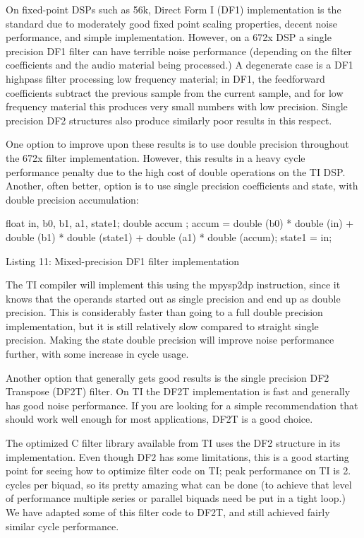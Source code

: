 On fixed-\/point D\+S\+Ps such as 56k, Direct Form I (D\+F1) implementation is the standard due to moderately good fixed point scaling properties, decent noise performance, and simple implementation. However, on a 672x D\+S\+P a single precision D\+F1 filter can have terrible noise performance (depending on the filter coefficients and the audio material being processed.) A degenerate case is a D\+F1 highpass filter processing low frequency material; in D\+F1, the feedforward coefficients subtract the previous sample from the current sample, and for low frequency material this produces very small numbers with low precision. Single precision D\+F2 structures also produce similarly poor results in this respect.

One option to improve upon these results is to use double precision throughout the 672x filter implementation. However, this results in a heavy cycle performance penalty due to the high cost of double operations on the T\+I D\+S\+P. Another, often better, option is to use single precision coefficients and state, with double precision accumulation\+:


\begin{DoxyCode}
\textcolor{keywordtype}{float} in, b0, b1, a1, state1;
\textcolor{keywordtype}{double} accum ;
accum = double (b0) * double (in) +
        double (b1) * double (state1) +
        double (a1) * double (accum);
state1 = in; 
\end{DoxyCode}
  Listing 11\+: Mixed-\/precision D\+F1 filter implementation

The T\+I compiler will implement this using the mpysp2dp instruction, since it knows that the operands started out as single precision and end up as double precision. This is considerably faster than going to a full double precision implementation, but it is still relatively slow compared to straight single precision. Making the state double precision will improve noise performance further, with some increase in cycle usage.

Another option that generally gets good results is the single precision D\+F2 Transpose (D\+F2\+T) filter. On T\+I the D\+F2\+T implementation is fast and generally has good noise performance. If you are looking for a simple recommendation that should work well enough for most applications, D\+F2\+T is a good choice.

The optimized C filter library available from T\+I uses the D\+F2 structure in its implementation. Even though D\+F2 has some limitations, this is a good starting point for seeing how to optimize filter code on T\+I; peak performance on T\+I is 2. cycles per biquad, so it\textquotesingle{}s pretty amazing what can be done (to achieve that level of performance multiple series or parallel biquads need be put in a tight loop.) We have adapted some of this filter code to D\+F2\+T, and still achieved fairly similar cycle performance.

